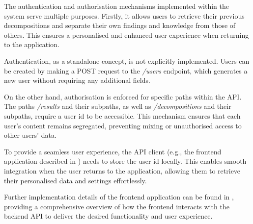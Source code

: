The authentication and authorisation mechanisms implemented within the system
serve multiple purposes. Firstly, it allows users to retrieve their previous
decompositions and separate their own findings and knowledge from those of
others. This ensures a personalised and enhanced user experience when returning
to the application.

Authentication, as a standalone concept, is not explicitly implemented. Users
can be created by making a POST request to the \textit{/users} endpoint, which
generates a new user without requiring any additional fields.

On the other hand, authorisation is enforced for specific paths within the API.
The paths \textit{/results} and their subpaths, as well as
\textit{/decompositions} and their subpaths, require a user id to be
accessible. This mechanism ensures that each user's content remains segregated,
preventing mixing or unauthorised access to other users' data.

To provide a seamless user experience, the API client (e.g., the frontend
application described in ) needs to store the user id
locally. This enables smooth integration when the user returns to the
application, allowing them to retrieve their personalised data and settings
effortlessly.

Further implementation details of the frontend application can be found in
, providing a comprehensive overview of how the
frontend interacts with the backend API to deliver the desired functionality
and user experience.

